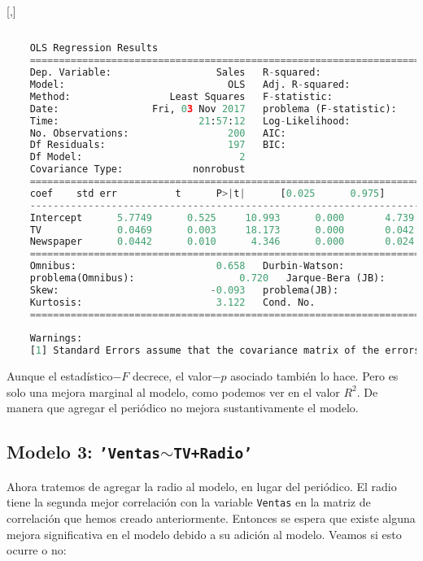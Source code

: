[,]{} 
\begin{lstlisting}[language=Python]
	
	OLS Regression Results
	==============================================================================
	Dep. Variable:                  Sales   R-squared:                       0.646
	Model:                            OLS   Adj. R-squared:                  0.642
	Method:                 Least Squares   F-statistic:                     179.6
	Date:                Fri, 03 Nov 2017   problema (F-statistic):           3.95e-45
	Time:                        21:57:12   Log-Likelihood:                -509.89
	No. Observations:                 200   AIC:                             1026.
	Df Residuals:                     197   BIC:                             1036.
	Df Model:                           2
	Covariance Type:            nonrobust
	==============================================================================
	coef    std err          t      P>|t|      [0.025      0.975]
	------------------------------------------------------------------------------
	Intercept      5.7749      0.525     10.993      0.000       4.739       6.811
	TV             0.0469      0.003     18.173      0.000       0.042       0.052
	Newspaper      0.0442      0.010      4.346      0.000       0.024       0.064
	==============================================================================
	Omnibus:                        0.658   Durbin-Watson:                   1.969
	problema(Omnibus):                  0.720   Jarque-Bera (JB):                0.415
	Skew:                          -0.093   problema(JB):                        0.813
	Kurtosis:                       3.122   Cond. No.                         410.
	==============================================================================
	
	Warnings:
	[1] Standard Errors assume that the covariance matrix of the errors is correctly specified.
\end{lstlisting}


Aunque el estadístico$-F$ decrece, el valor$-p$ asociado también lo hace. Pero es solo una mejora marginal al modelo, como podemos ver en el valor $R^{2}.$ De manera que agregar el periódico no mejora sustantivamente el modelo.

\subsection{Modelo 3: \texttt{'Ventas$\sim$TV+Radio'}}

Ahora tratemos de agregar la radio al modelo, en lugar del periódico. El radio tiene la segunda mejor correlación con la variable \texttt{Ventas} en la matriz de correlación que hemos creado anteriormente.  Entonces se espera que existe alguna mejora significativa en el modelo debido a su adición al modelo.  Veamos si esto ocurre o no:

